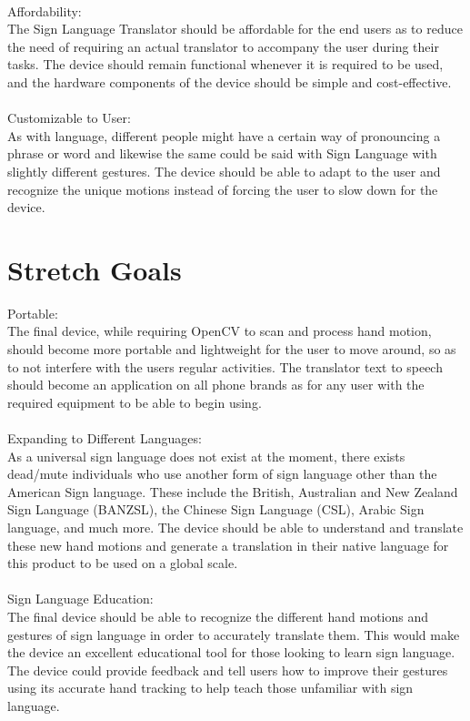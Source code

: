 \documentclass{article}
\begin{document}
~\\Affordability:\\
The Sign Language Translator should be affordable for the end users as to reduce the need of requiring an actual translator 
to accompany the user during their tasks. The device should remain functional whenever it is required to be used, and the hardware components
 of the device should be simple and cost-effective.\\

~\\Customizable to User:\\
As with language, different people might have a certain way of pronouncing a phrase or word and likewise the same could be said with Sign Language 
with slightly different gestures. The device should be able to adapt to the user and recognize the unique motions instead of forcing the user to 
slow down for the device. 

\section{Stretch Goals}

Portable:\\
The final device, while requiring OpenCV to scan and process hand motion, should become more portable and lightweight for the user
to move around, so as to not interfere with the user\textquotesingle s regular activities. The translator text to speech should
become an application on all phone brands as for any user with the required equipment to be able to begin using.\\

~\\Expanding to Different Languages:\\
As a universal sign language does not exist at the moment, there exists dead/mute individuals who use another form of sign language
other than the American Sign language. These include the British, Australian and New Zealand Sign Language (BANZSL), the Chinese Sign
Language (CSL), Arabic Sign language, and much more. The device should be able to understand and translate these new hand motions and
generate a translation in their native language for this product to be used on a global scale.\\

~\\Sign Language Education:\\
The final device should be able to recognize the different hand motions and gestures of sign language in order to accurately 
translate them. This would make the device an excellent educational tool for those looking to learn sign language. The device could 
provide feedback and tell users how to improve their gestures using it\textquotesingle s accurate hand tracking to help teach those unfamiliar with 
sign language.
\end{document}
